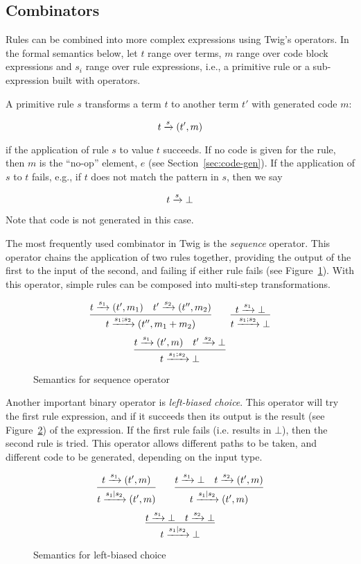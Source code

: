 \subsection{Combinators}

Rules can be combined into more complex expressions using Twig's operators. In
the formal semantics below, let $t$ range over terms, $m$ range over code block
expressions and $s_i$ range over rule expressions, i.e., a primitive rule or a
sub-expression built with operators.

A primitive rule $s$ transforms a term $t$ to another term $t'$ with generated
code $m$:

\[
t \xrightarrow{s} (t',m)
\]

if the application of rule $s$ to value $t$ succeeds. If no code is given for
the rule, then $m$ is the ``no-op'' element, $e$ (see
Section~\ref{sec:code-gen}). If the application of $s$ to $t$ fails, e.g., if
$t$ does not match the pattern in $s$, then we say

\[
t \xrightarrow{s} \bot
\]

Note that code is not generated in this case.

The most frequently used combinator in Twig is the \emph{sequence} operator.
This operator chains the application of two rules together, providing the output
of the first to the input of the second, and failing if either rule fails (see
Figure~\ref{semantics:sequence}). With this operator, simple rules can be
composed into multi-step transformations.

\begin{figure}[ht]
\label{semantics:sequence}
\[
\infer{t \arr{s_1;s_2} (t'',m_1+m_2)}{t \arr{s_1} (t',m_1) \quad t' \arr{s_2} (t'',m_2)}
\qquad 
\infer{t \arr{s_1;s_2} \bot}{t \arr{s_1} \bot}
\]
\[
\infer{t \arr{s_1;s_2} \bot}{t \arr{s_1} (t',m) \quad t' \arr{s_2} \bot}
\]
\caption{Semantics for sequence operator}
\end{figure}

Another important binary operator is \emph{left-biased choice}. This operator
will try the first rule expression, and if it succeeds then its output is the
result (see Figure~\ref{semantics:choice}) of the expression. If the first rule
fails (i.e. results in $\bot$), then the second rule is tried. This operator
allows different paths to be taken, and different code to be generated,
depending on the input type.

\begin{figure}[ht]
\label{semantics:choice}
\[
\infer{t \arr{s_1|s_2} (t',m)}{t \arr{s_1} (t',m)}
\qquad 
\infer{t \arr{s_1|s_2} (t',m)}{t \arr{s_1} \bot \quad t \arr{s_2} (t',m)}
\]
\[
\infer{t \arr{s_1|s_2} \bot}{t \arr{s_1} \bot \quad t \arr{s_2} \bot}
\]
\caption{Semantics for left-biased choice}
\end{figure}

